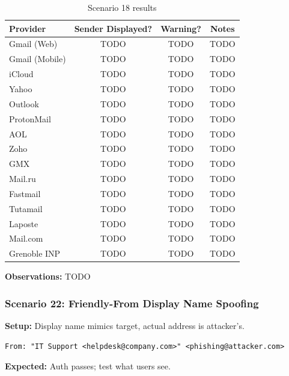 \documentclass[11pt,a4paper]{article}
\begin{document}
\begin{table}[h]
\centering
\small
\begin{tabular}{lccc}
\toprule
\textbf{Provider} & \textbf{Sender Displayed?} & \textbf{Warning?} & \textbf{Notes} \\
\midrule
Gmail (Web) & TODO & TODO & TODO \\
Gmail (Mobile) & TODO & TODO & TODO \\
iCloud & TODO & TODO & TODO \\
Yahoo & TODO & TODO & TODO \\
Outlook & TODO & TODO & TODO \\
ProtonMail & TODO & TODO & TODO \\
AOL & TODO & TODO & TODO \\
Zoho & TODO & TODO & TODO \\
GMX & TODO & TODO & TODO \\
Mail.ru & TODO & TODO & TODO \\
Fastmail & TODO & TODO & TODO \\
Tutamail & TODO & TODO & TODO \\
Laposte & TODO & TODO & TODO \\
Mail.com & TODO & TODO & TODO \\
Grenoble INP & TODO & TODO & TODO \\
\bottomrule
\end{tabular}
\caption{Scenario 18 results}
\end{table}

\textbf{Observations:} TODO


\subsubsection{Scenario 22: Friendly-From Display Name Spoofing}

\textbf{Setup:} Display name mimics target, actual address is attacker's.

\begin{lstlisting}
From: "IT Support <helpdesk@company.com>" <phishing@attacker.com>
\end{lstlisting}

\textbf{Expected:} Auth passes; test what users see.
\end{document}
